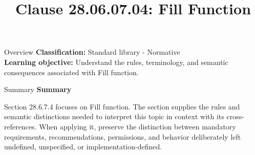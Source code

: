 \documentclass[10pt,letterpaper]{article}
\title{Clause 28.06.07.04: Fill Function}
\author{}
\date{}
\begin{document}
\maketitle
\begin{CornellOverviewBox}{Overview}
\textbf{Classification:} Standard library - Normative\\[2pt]
\textbf{Learning objective:} Understand the rules, terminology, and semantic consequences associated with Fill function.
\end{CornellOverviewBox}\begin{CornellSummaryBox}{Summary}
{\sffamily\bfseries\color{Accent} Summary}\par\vspace{3pt}Section 28.6.7.4 focuses on Fill function. The section supplies the rules and semantic distinctions needed to interpret this topic in context with its cross-references. When applying it, preserve the distinction between mandatory requirements, recommendations, permissions, and behavior deliberately left undefined, unspecified, or implementation-defined.
\end{CornellSummaryBox}
\end{document}

